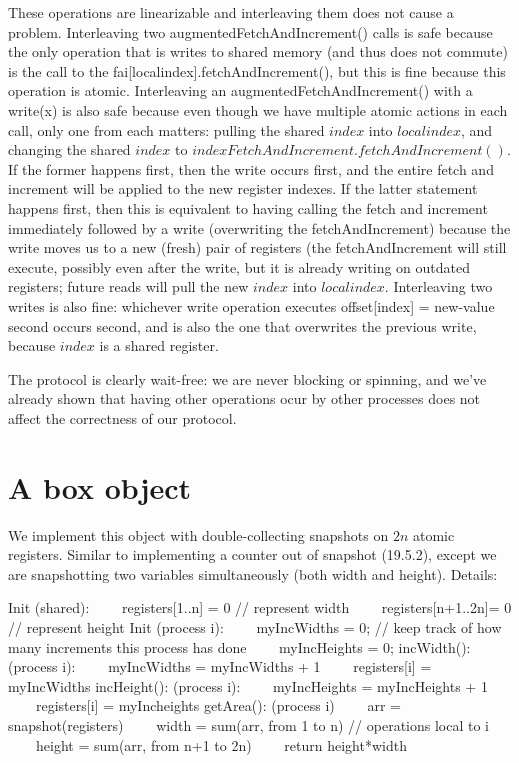\documentclass{article}
\begin{document}
These operations are linearizable and interleaving them does not cause a problem. Interleaving two augmentedFetchAndIncrement() calls is safe because the only operation that is writes to shared memory (and thus does not commute) is the call to the fai[localindex].fetchAndIncrement(), but this is fine because this operation is atomic.  Interleaving an augmentedFetchAndIncrement() with a write(x) is also safe because even though we have multiple atomic actions in each call, only one from each matters: pulling the shared $index$ into $localindex$, and changing the shared $index$ to $indexFetchAndIncrement.fetchAndIncrement()$. If the former happens first, then the write occurs first, and the entire fetch and increment will be applied to the new register indexes. If the latter statement happens first, then this is equivalent to having calling the fetch and increment immediately followed by a write (overwriting the fetchAndIncrement) because the write moves us to a new (fresh) pair of registers (the fetchAndIncrement will still execute, possibly even after the write, but it is already writing on outdated registers; future reads will pull the new $index$ into $localindex$. Interleaving two writes is also fine: whichever write operation executes offset[index] = new-value second occurs second, and is also the one that overwrites the previous write, because $index$ is a shared register.

The protocol is clearly wait-free: we are never blocking or spinning, and we've already shown that having other operations ocur by other processes does not affect the correctness of our protocol.

\section{A box object}
We implement this object with double-collecting snapshots on $2n$ atomic registers. Similar to implementing a counter out of snapshot (19.5.2), except we are snapshotting two variables simultaneously (both width and height). Details:
\begin{algorithmic}
\STATE Init (shared):
\STATE \ \ \ \ registers[1..n] = 0 // represent width
\STATE \ \ \ \ registers[n+1..2n]= 0 // represent height
\STATE Init (process i):
\STATE \ \ \ \ myIncWidths = 0;	// keep track of how many increments this process has done
\STATE \ \ \ \ myIncHeights = 0;
\STATE 
\STATE incWidth(): (process i):
\STATE \ \ \ \ myIncWidths = myIncWidths + 1
\STATE \ \ \ \ registers[i] =  myIncWidths
\STATE 
\STATE incHeight(): (process i):
\STATE \ \ \ \ myIncHeights = myIncHeights + 1
\STATE \ \ \ \ registers[i] =  myIncheights
\STATE 
\STATE getArea(): (process i)
\STATE \ \ \ \ arr = snapshot(registers)
\STATE \ \ \ \ width = sum(arr, from 1 to n) // operations local to i
\STATE \ \ \ \ height = sum(arr, from n+1 to 2n)
\STATE \ \ \ \ return height*width
\end{algorithmic}
\end{document}
